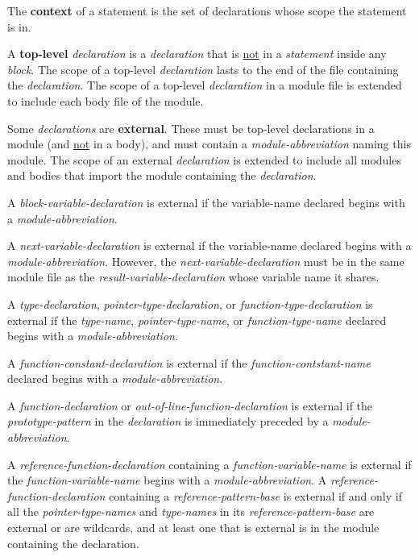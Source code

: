 \documentclass[12pt]{article}
\newcommand{\key}[1]{{\rm \bfseries #1}}
\begin{document}
The \key{context}\label{CONTEXT} of a statement is the set of declarations
whose scope the statement is in.

A \key{top-level} {\em declaration} is a {\em declaration} that is
\underline{not} in a {\em statement} inside any {\em block}.
The scope of a top-level {\em declaration} lasts to the end of the
file containing the {\em declaration}.
The scope of a top-level {\em declaration} in a module file is extended
to include each body file of the module.

Some {\em declarations} are \key{external}\label{EXTERNAL}.
These must be top-level declarations in a module (and \underline{not}
in a body), and must contain a {\em module-abbreviation} naming this
module.
The scope of an external
{\em declaration} is extended to include all modules and bodies that
import the module containing the {\em declaration}.

A {\em block-variable-declaration}
is external if the {variable-name} declared begins with a
{\em module-abbreviation}.

A {\em next-variable-declaration}
is external if the {variable-name} declared begins with a
{\em module-abbreviation}.  However, the {\em next-variable-declaration}
must be in the same module file as the {\em result-variable-declaration}
whose variable name it shares.

A {\em type-declaration}, {\em pointer-type-declaration}, or
{\em function-type-declaration}
\label{EXTERNAL-TYPE-NAME}
is external if the {\em type-name}, {\em pointer-type-name},
or {\em function-type-name}
declared begins with a
{\em module-abbrev\-i\-a\-tion}.

A {\em function-constant-declaration}
is external if the {\em function-contstant-name}
declared begins with a
{\em module-abbrev\-i\-a\-tion}.

A {\em function-declaration}
or {\em out-of-line-function-declar\-a\-tion}
is external\label{EXTERNAL-FUNCTION}
if the {\em prototype-pattern} in the {\em declaration}
is immediately preceded by a {\em module-abbreviation}.

A {\em reference-function-declaration} containing a
{\em function-variable-name}
is external if the {\em func\-tion-variable-name} begins with a
{\em module-abbreviation}.
A {\em reference-function-declaration} containing a
{\em reference-pattern-base} is external if and only if
all the {\em pointer-type-names}
and {\em type-names} in its {\em reference-pattern-base} are external or
are wildcards, and at least one that is external is in the
module containing the declaration.
\end{document}
